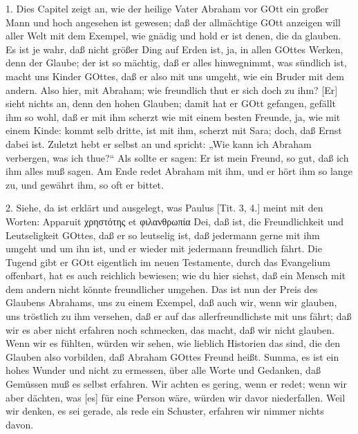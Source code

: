 1. Dies Capitel zeigt an, wie der heilige Vater Abraham vor GOtt ein großer Mann und hoch angesehen ist gewesen; daß der allmächtige GOtt anzeigen will aller Welt mit dem Exempel, wie gnädig und hold er ist denen, die da glauben. Es ist je wahr, daß nicht größer Ding auf Erden ist, ja, in allen GOttes Werken, denn der Glaube; der ist so mächtig, daß er alles hinwegnimmt, was sündlich ist, macht uns Kinder GOttes, daß er also mit uns umgeht, wie ein Bruder mit dem andern. Also hier, mit Abraham; wie freundlich thut er sich doch zu ihm? [Er] sieht nichts an, denn den hohen Glauben; damit hat er GOtt gefangen, gefällt ihm so wohl, daß er mit ihm scherzt wie mit einem besten Freunde, ja, wie mit einem Kinde: kommt selb dritte, ist mit ihm, scherzt mit Sara; doch, daß Ernst dabei ist. Zuletzt hebt er selbst an und spricht: „Wie kann ich Abraham verbergen, was ich thue?“ Als sollte er sagen: Er ist mein Freund, so gut, daß ich ihm alles muß sagen. Am Ende redet Abraham mit ihm, und er hört ihm so lange zu, und gewährt ihm, so oft er bittet.

2. Siehe, da ist erklärt und ausgelegt, was Paulus [Tit. 3, 4.] meint mit den Worten: Apparuit χρηστότης et φιλανθρωπία Dei, daß ist, die Freundlichkeit und Leutseligkeit GOttes, daß er so leutselig ist, daß jedermann gerne mit ihm umgeht und um ihn ist, und er wieder mit jedermann freundlich fährt. Die Tugend gibt er GOtt eigentlich im neuen Testamente, durch das Evangelium offenbart, hat es auch reichlich bewiesen; wie du hier siehst, daß ein Mensch mit dem andern nicht könnte freundlicher umgehen. Das ist nun der Preis des Glaubens Abrahams, uns zu einem Exempel, daß auch wir, wenn wir glauben, uns tröstlich zu ihm versehen, daß er auf das allerfreundlichste mit uns fährt; daß wir es aber nicht erfahren noch schmecken, das macht, daß wir nicht glauben. Wenn wir es fühlten, würden wir sehen, wie lieblich Historien das sind, die den Glauben also vorbilden, daß Abraham GOttes Freund heißt. Summa, es ist ein hohes Wunder und nicht zu ermessen, über alle Worte und Gedanken, daß Gemüssen muß es selbst erfahren. Wir achten es gering, wenn er redet; wenn wir aber dächten, was [es] für eine Person wäre, würden wir davor niederfallen. Weil wir denken, es sei gerade, als rede ein Schuster, erfahren wir nimmer nichts davon.

